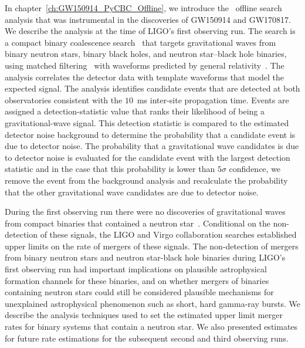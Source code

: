 In chapter~\ref{ch:GW150914_PyCBC_Offline}, we introduce the \pycbc{}\ offline search analysis that was instrumental in the discoveries of GW150914 and GW170817. We describe the analysis at the time of LIGO's first observing run. The \pycbc{} search is a compact binary coalescence search~\cite{thorne.k:1987,Sathyaprakash:1991mt,Cutler:1992tc,Finn:1992wt,Finn:1992xs,Dhurandhar:1992mw,Balasubramanian:1995bm,Flanagan:1997sx} that targets gravitational waves from binary neutron stars, binary black holes, and neutron star--black hole binaries, using matched filtering~\cite{wainstein:1962} with waveforms predicted by general relativity~\cite{Peters:1963ux,Blanchet2006,Buonanno:1998gg,Buonanno:2000ef,Damour:2000we,Damour:2001tu,Ajith:2007qp,Ajith:2009bn,Santamaria:2010yb}.  The \pycbc{} analysis correlates the detector data with template waveforms that model the expected signal. The analysis identifies candidate events that are detected at both observatories consistent with the $10$~ms inter-site propagation time. Events are assigned a detection-statistic value that ranks their likelihood of being a gravitational-wave signal. This detection statistic is compared to the estimated detector noise background to determine the probability that a candidate event is due to detector noise. The probability that a gravitational wave candidates is due to detector noise is evaluated for the candidate event with the largest detection statistic and in the case that this probability is lower than $5 \sigma$ confidence, we remove the event from the background analysis and recalculate the probability that the other gravitational wave candidates are due to detector noise.

During the first observing run there were no discoveries of gravitational waves from compact binaries that contained a neutron star~\cite{O1BBH}. Conditional on the non-detection of these signals, the LIGO and Virgo collaboration searches established upper limits on the rate of mergers of these signals. The non-detection of mergers from binary neutron stars and neutron star-black hole binaries during LIGO's first observing run had important implications on plausible astrophysical formation channels for these binaries, and on whether mergers of binaries containing neutron stars could still be considered plausible mechanisms for unexplained astrophysical phenomenon such as short, hard gamma-ray bursts. We describe the analysis techniques used to set the estimated upper limit merger rates for binary systems that contain a neutron star. We also presented estimates for future rate estimations for the subsequent second and third observing runs.

